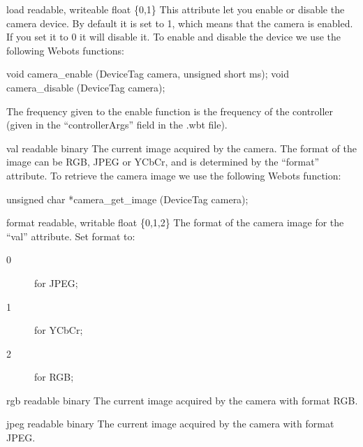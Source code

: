 \noindent
\begin{itemize}
\begin{attribute}{load}
  {readable, writeable}
  {float}
  {\{0,1\}}
  This attribute let you enable or disable the camera
  device.  By default it is set to 1, which means that the camera is
  enabled. If you set it to 0 it will disable it.  To enable and
  disable the device we use the following Webots functions:

\begin{cxx}
void camera_enable (DeviceTag camera, unsigned short ms);
void camera_disable (DeviceTag camera);
\end{cxx}

The frequency given to the enable function is the frequency of the
\urbi controller (given in the ``controllerArgs'' field in the .wbt
file).
\end{attribute}

\begin{attribute}{val}
  {readable}
  {binary}
  {}
  The current image acquired by the camera. The format of
  the image can be RGB, JPEG or YCbCr, and is determined by the
  ``format'' attribute.  To retrieve the camera image we use the
  following Webots function:


\begin{cxx}
unsigned char *camera_get_image (DeviceTag camera);
\end{cxx}
\end{attribute}

\begin{attribute}{format}
  {readable, writable}
  {float}
  {\{0,1,2\}}
  The format of the camera image for the ``val''
  attribute. Set format to:

  \begin{description}
  \item[0] for JPEG;
  \item[1] for YCbCr;
  \item[2] for RGB;
  \end{description}
\end{attribute}

\begin{attribute}{rgb}
  {readable}
  {binary}
  {}
  The current image acquired by the camera with format RGB.
\end{attribute}

\begin{attribute}{jpeg}
  {readable}
  {binary}
  {}
  The current image acquired by the camera with format JPEG.
\end{attribute}


\end{itemize}
